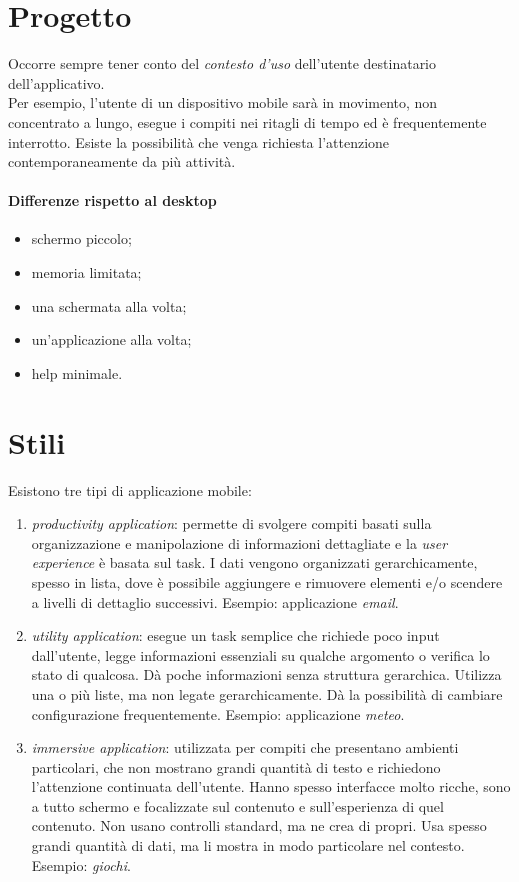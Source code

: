 \section{Progetto}
Occorre sempre tener conto del \textit{contesto d'uso} dell'utente destinatario dell'applicativo. \\
Per esempio, l'utente di un dispositivo mobile sar\`a in movimento, non concentrato a lungo, esegue i compiti nei ritagli di tempo ed \`e frequentemente interrotto. Esiste la possibilit\`a che venga richiesta l'attenzione contemporaneamente da pi\`u attivit\`a.

\paragraph{Differenze rispetto al desktop}
\begin{itemize}
	\item schermo piccolo;
	\item memoria limitata;
	\item una schermata alla volta;
	\item un'applicazione alla volta;
	\item help minimale.
\end{itemize}

\section{Stili}
Esistono tre tipi di applicazione mobile:
\begin{enumerate}
	\item \textit{productivity application}: permette di svolgere compiti basati sulla organizzazione e manipolazione di informazioni dettagliate e la \textit{user experience} \`e basata sul task. I dati vengono organizzati gerarchicamente, spesso in lista, dove \`e possibile aggiungere e rimuovere elementi e/o scendere a livelli di dettaglio successivi. Esempio: applicazione \textit{email}.
	\item \textit{utility application}: esegue un task semplice che richiede poco input dall'utente, legge informazioni essenziali su qualche argomento o verifica lo stato di qualcosa. D\`a poche informazioni senza struttura gerarchica. Utilizza una o pi\`u liste, ma non legate gerarchicamente. D\`a la possibilit\`a di cambiare configurazione frequentemente. Esempio: applicazione \textit{meteo}.
	\item \textit{immersive application}: utilizzata per compiti che presentano ambienti particolari, che non mostrano grandi quantit\`a di testo e richiedono l'attenzione continuata dell'utente. Hanno spesso interfacce molto ricche, sono a tutto schermo e focalizzate sul contenuto e sull'esperienza di quel contenuto. Non usano controlli standard, ma ne crea di propri. Usa spesso grandi quantit\`a di dati, ma li mostra in modo particolare nel contesto. Esempio: \textit{giochi}.
\end{enumerate}

